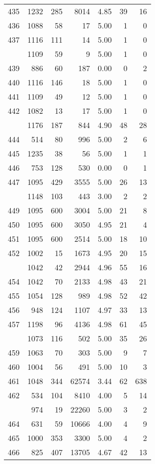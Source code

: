 \documentclass[
]{article}
\begin{document}
\begin{table}
\begin{tabular}[t]{lrrrrrr}
435 & 1232 & 285 & 8014 & 4.85 & 39 & 16\\
436 & 1088 & 58 & 17 & 5.00 & 1 & 0\\
437 & 1116 & 111 & 14 & 5.00 & 1 & 0\\
\addlinespace
438 & 1109 & 59 & 9 & 5.00 & 1 & 0\\
439 & 886 & 60 & 187 & 0.00 & 0 & 2\\
440 & 1116 & 146 & 18 & 5.00 & 1 & 0\\
441 & 1109 & 49 & 12 & 5.00 & 1 & 0\\
442 & 1082 & 13 & 17 & 5.00 & 1 & 0\\
\addlinespace
443 & 1176 & 187 & 844 & 4.90 & 48 & 28\\
444 & 514 & 80 & 996 & 5.00 & 2 & 6\\
445 & 1235 & 38 & 56 & 5.00 & 1 & 1\\
446 & 753 & 128 & 530 & 0.00 & 0 & 1\\
447 & 1095 & 429 & 3555 & 5.00 & 26 & 13\\
\addlinespace
448 & 1148 & 103 & 443 & 3.00 & 2 & 2\\
449 & 1095 & 600 & 3004 & 5.00 & 21 & 8\\
450 & 1095 & 600 & 3050 & 4.95 & 21 & 4\\
451 & 1095 & 600 & 2514 & 5.00 & 18 & 10\\
452 & 1002 & 15 & 1673 & 4.95 & 20 & 15\\
\addlinespace
453 & 1042 & 42 & 2944 & 4.96 & 55 & 16\\
454 & 1042 & 70 & 2133 & 4.98 & 43 & 21\\
455 & 1054 & 128 & 989 & 4.98 & 52 & 42\\
456 & 948 & 124 & 1107 & 4.97 & 33 & 13\\
457 & 1198 & 96 & 4136 & 4.98 & 61 & 45\\
\addlinespace
458 & 1073 & 116 & 502 & 5.00 & 35 & 26\\
459 & 1063 & 70 & 303 & 5.00 & 9 & 7\\
460 & 1004 & 56 & 491 & 5.00 & 10 & 3\\
461 & 1048 & 344 & 62574 & 3.44 & 62 & 638\\
462 & 534 & 104 & 8410 & 4.00 & 5 & 14\\
\addlinespace
463 & 974 & 19 & 22260 & 5.00 & 3 & 2\\
464 & 631 & 59 & 10666 & 4.00 & 4 & 9\\
465 & 1000 & 353 & 3300 & 5.00 & 4 & 2\\
466 & 825 & 407 & 13705 & 4.67 & 42 & 13\\

\end{tabular}
\end{table}
\end{document}
